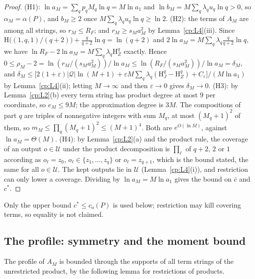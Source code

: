 \documentclass[11pt]{article}
\theoremstyle{definition}
\theoremstyle{remark}
\providecommand{\eps}{\varepsilon}
\newcommand{\abs}[1]{\lvert #1\rvert}
\newcommand{\Ent}{\mathrm{H}}                 %
\newcommand{\cstar}{c^{*}}                    %
\newcommand{\cbar}{\bar c}                    %
\newcommand{\co}{c_{\mathrm o}}               %
\newcommand{\Hcond}[1]{\textup{(H#1)}}        %
\newcommand{\Qs}{\mathcal{Q}}                 %
\newcommand{\Ukept}{\mathcal{U}}              %
\begin{document}
\begin{proof}
\Hcond1: $\ln a_M=\sum_qp_qM_q\ln q=M\ln a_1$ and $\ln b_M=M\sum_q\lambda_qu_q\ln q>0$, so $\alpha_M=\alpha(P)$, and $b_M\ge2$ once $M\sum_q\lambda_qu_q\ln q\ge\ln2$.
\Hcond2: the terms of $A_M$ are among all strings, so $r_M\le R_F$; and $r_M\ge s_Ma_M^2$ by Lemma~\ref{cp:L4}(iii). Since $\Ent\bigl((1,q,1)/(q+2)\bigr)+\frac q{q+2}\ln q=\ln(q+2)$ and $2\ln a_M=M\sum_q\lambda_q\frac q{q+2}\ln q$, we have $\ln R_F-2\ln a_M=M\sum_q\lambda_q\Ent^q_Z$ exactly. Hence $0\le\rho_M-2=\ln(r_M/(s_Ma_M^2))/\ln a_M\le\ln(R_F/(s_Ma_M^2))/\ln a_M=\delta_M$, and $\delta_M\le\bigl[2(1+\eps)\abs\Qs\ln(M+1)+\eps M\sum_q\lambda_q(\Ent^q_J-\Ent^q_Z)+C_\eps\bigr]/(M\ln a_1)$ by Lemma~\ref{cp:L4}(ii); letting $M\to\infty$ and then $\eps\to0$ gives $\delta_M\to0$.
\Hcond3: by Lemma~\ref{cp:L2}(b) every term string has product degree at most $9$ per coordinate, so $e_M\le9M$; the approximation degree is $3M$. The compositions of part $q$ are triples of nonnegative integers with sum $M_q$, at most $(M_q+1)^2$ of them, so $m_M\le\prod_q(M_q+1)^2\le(M+1)^4$. Both are $e^{O(\ln M)}$, against $\ln a_M=\Theta(M)$.
\Hcond4: by Lemma~\ref{cp:L2}(a) and the product rule, the coverage of an output $o\in\Ukept$ under the product decomposition is $\prod_\ell$ of $q+2$, $2$ or $1$ according as $o_\ell=z_0$, $o_\ell\in\{z_1,\dots,z_q\}$ or $o_\ell=z_{q+1}$, which is the bound stated, the same for all $o\in\Ukept$. The kept outputs lie in $\Ukept$ (Lemma~\ref{cp:L4}(i)), and restriction can only lower a coverage. Dividing by $\ln a_M=M\ln a_1$ gives the bound on $\cbar$ and $\cstar$.
\end{proof}

Only the upper bound $\cstar\le\co(P)$ is used below; restriction may kill covering terms, so equality is not claimed.

\subsection{The profile: symmetry and the moment bound}\label{cp:sec:moment}

The profile of $A_M$ is bounded through the supports of all term strings of the unrestricted product, by the following lemma for restrictions of products.
\end{document}
